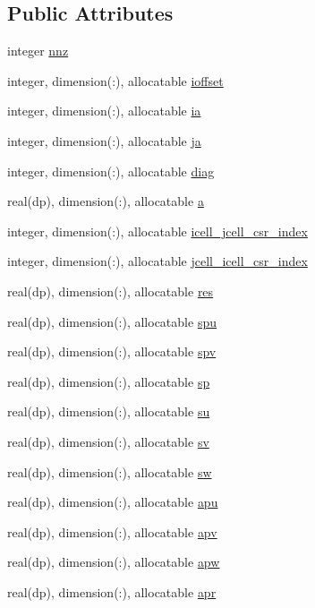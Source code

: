 \subsection*{Public Attributes}
\begin{DoxyCompactItemize}
\item 
integer \hyperlink{classsparse__matrix_ad6a2543199072d90691146df32537711}{nnz}
\item 
integer, dimension(\-:), allocatable \hyperlink{classsparse__matrix_a0fe5fb1f5d374957667c8c6d518f0496}{ioffset}
\item 
integer, dimension(\-:), allocatable \hyperlink{classsparse__matrix_a9c09a4d79a9e8dba4676b4a9c8d8c03f}{ia}
\item 
integer, dimension(\-:), allocatable \hyperlink{classsparse__matrix_a22b8c3020caa557baaea011f3573ff86}{ja}
\item 
integer, dimension(\-:), allocatable \hyperlink{classsparse__matrix_a79931d26508e8a91c9d8f01ac9577ec9}{diag}
\item 
real(dp), dimension(\-:), allocatable \hyperlink{classsparse__matrix_a2a9ab7da94dd5aa82b18a3d4748adb4e}{a}
\item 
integer, dimension(\-:), allocatable \hyperlink{classsparse__matrix_ab518ae98fdc57bba1c644f1cfeff9126}{icell\-\_\-jcell\-\_\-csr\-\_\-index}
\item 
integer, dimension(\-:), allocatable \hyperlink{classsparse__matrix_ad984afee6f0ab8b2dbfcebfb10865373}{jcell\-\_\-icell\-\_\-csr\-\_\-index}
\item 
real(dp), dimension(\-:), allocatable \hyperlink{classsparse__matrix_a49eac71f962298b72196fc162abc00af}{res}
\item 
real(dp), dimension(\-:), allocatable \hyperlink{classsparse__matrix_a93f5d23e4ca4f9de87aea445dbf661d7}{spu}
\item 
real(dp), dimension(\-:), allocatable \hyperlink{classsparse__matrix_a18a8d88bb263103e7f90204933644fd5}{spv}
\item 
real(dp), dimension(\-:), allocatable \hyperlink{classsparse__matrix_abb95d5c106775cd62ab9e83a686efdb9}{sp}
\item 
real(dp), dimension(\-:), allocatable \hyperlink{classsparse__matrix_ade8eb3ba921407598d6d1a07ebacc9cd}{su}
\item 
real(dp), dimension(\-:), allocatable \hyperlink{classsparse__matrix_accb06b29e89794ede55aebd48d3d91b2}{sv}
\item 
real(dp), dimension(\-:), allocatable \hyperlink{classsparse__matrix_a4a73c86b95b3ef82f3f1c2b9fb0aab03}{sw}
\item 
real(dp), dimension(\-:), allocatable \hyperlink{classsparse__matrix_a699e66e8c57459cd313568e687ee1fc4}{apu}
\item 
real(dp), dimension(\-:), allocatable \hyperlink{classsparse__matrix_a07a78a7794c84e258becc676096f3201}{apv}
\item 
real(dp), dimension(\-:), allocatable \hyperlink{classsparse__matrix_a57f3206d8ccad08131056ba13ae81af4}{apw}
\item 
real(dp), dimension(\-:), allocatable \hyperlink{classsparse__matrix_a9fd644b9786555d9955e8d943c1ac228}{apr}
\end{DoxyCompactItemize}


